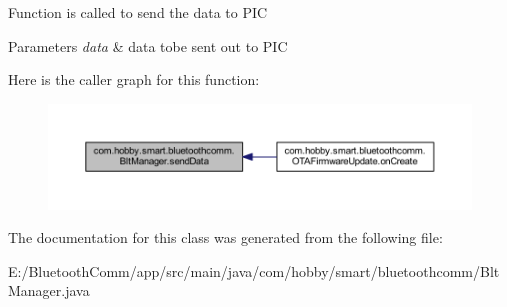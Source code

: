 Function is called to send the data to P\+IC 
\begin{DoxyParams}{Parameters}
{\em data} & data tobe sent out to P\+IC \\
\hline
\end{DoxyParams}
Here is the caller graph for this function\+:\nopagebreak
\begin{figure}[H]
\begin{center}
\leavevmode
\includegraphics[width=350pt]{classcom_1_1hobby_1_1smart_1_1bluetoothcomm_1_1_blt_manager_a9d223f09362d0281ed7960ca18d089eb_icgraph}
\end{center}
\end{figure}


The documentation for this class was generated from the following file\+:\begin{DoxyCompactItemize}
\item 
E\+:/\+Bluetooth\+Comm/app/src/main/java/com/hobby/smart/bluetoothcomm/Blt\+Manager.\+java\end{DoxyCompactItemize}
